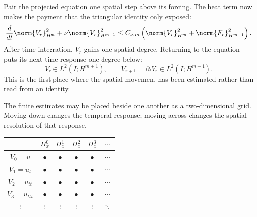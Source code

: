 Pair the projected equation one spatial step above its forcing.  The heat term
now makes the payment that the triangular identity only exposed:
\begin{equation}\label{eq:BodyTemporalResponseParabolicGain}
  \frac d{dt}\norm{V_r}_{H^m}^2
  +\nu\norm{V_r}_{H^{m+1}}^2
  \leq
  C_{\nu,m}\left(
    \norm{V_r}_{H^m}^2+\norm{F_r}_{H^{m-1}}^2
  \right).
\end{equation}
After time integration, \(V_r\) gains one spatial degree.  Returning to the
equation puts its next time response one degree below:
\begin{equation}\label{eq:BodyStrictIntervalAdjacentResponsePair}
  V_r\in L^2(I;H^{m+1}),
  \qquad
  V_{r+1}=\partial_tV_r\in L^2(I;H^{m-1}).
\end{equation}
This is the first place where the spatial movement has been estimated rather
than read from an identity.

The finite estimates may be placed beside one another as a two-dimensional
grid.  Moving down changes the temporal response; moving across changes the
spatial resolution of that response.
\begin{center}
\captionsetup{hypcap=false}
\label{tab:MixedDerivativeGrid}
\renewcommand{\arraystretch}{1.35}
\begin{tabular}{@{}c c c c c c@{}}
\toprule
& \(H^0_x\) & \(H^1_x\) & \(H^2_x\) & \(H^3_x\) & \(\cdots\) \\
\midrule
\(V_0=u\) & \(\bullet\) & \(\bullet\) & \(\bullet\) & \(\bullet\) & \(\cdots\) \\
\(V_1=u_t\) & \(\bullet\) & \(\bullet\) & \(\bullet\) & \(\bullet\) & \(\cdots\) \\
\(V_2=u_{tt}\) & \(\bullet\) & \(\bullet\) & \(\bullet\) & \(\bullet\) & \(\cdots\) \\
\(V_3=u_{ttt}\) & \(\bullet\) & \(\bullet\) & \(\bullet\) & \(\bullet\) & \(\cdots\) \\
\(\vdots\) & \(\vdots\) & \(\vdots\) & \(\vdots\) & \(\vdots\) & \(\ddots\) \\
\bottomrule
\end{tabular}
\end{center}

